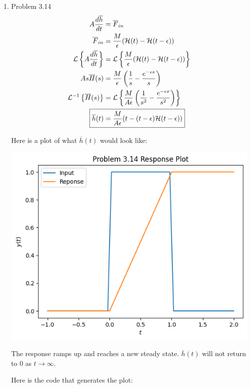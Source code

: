\documentclass[12pt]{article}
\begin{document}
\begin{enumerate}
\newpage
\item Problem 3.14
\begin{align*}
    A \frac{d\overline{h}}{dt} &= \overline{F}_{in} \\
    \overline{F}_{in} &= \frac{M}{\epsilon} (\mathcal{H}(t) - \mathcal{H}(t - \epsilon)) \\ 
    \mathcal{L}\left\{ A \frac{d\overline{h}}{dt} \right\} &= \mathcal{L}\left\{ \frac{M}{\epsilon} (\mathcal{H}(t) - \mathcal{H}(t - \epsilon)) \right\} \\
    As\overline{H}(s) &= \frac{M}{\epsilon} \left( \frac{1}{s} - \frac{e^{-\epsilon s}}{s} \right)\\
    \mathcal{L}^{-1}\left\{\overline{H}(s)\right\} &= \mathcal{L}\left\{\frac{M}{A \epsilon} \left( \frac{1}{s^2} - \frac{e^{-\epsilon s}}{s^2} \right)\right\} \\
    \Aboxed{\overline{h}(t) &= \frac{M}{A\epsilon} (t - (t - \epsilon) \mathcal{H}(t - \epsilon))}
\end{align*}

Here is a plot of what $\overline{h}(t)$ would look like:

\includegraphics{461HW4_P314.png}

The response ramps up and reaches a new steady state. $\overline{h}(t)$ will not return to 0 as $t\rightarrow\infty$.

\newpage

Here is the code that generates the plot:


\end{enumerate}
\end{document}

